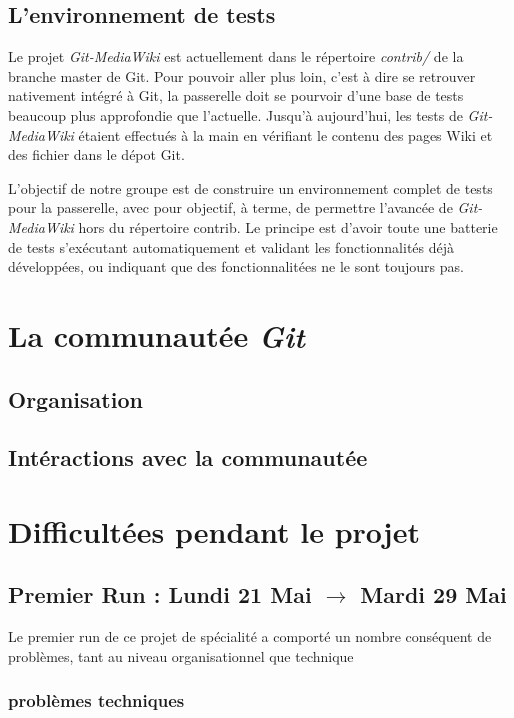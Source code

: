 \documentclass[11pt]{article}
\begin{document}
\subsection{L'environnement de tests}

Le projet \textit{Git-MediaWiki} est actuellement dans le répertoire \textit{contrib/} de la branche master de Git. Pour pouvoir aller plus loin, c'est à dire se retrouver nativement intégré à Git, la passerelle doit se pourvoir d'une base de tests beaucoup plus approfondie que l'actuelle. Jusqu'à aujourd'hui, les tests de \textit{Git-MediaWiki} étaient effectués à la main en vérifiant le contenu des pages Wiki et des fichier dans le dépot Git. 

L'objectif de notre groupe est de construire un environnement complet de tests pour la passerelle, avec pour objectif, à terme, de permettre l'avancée de \textit{Git-MediaWiki} hors du répertoire contrib. Le principe est d'avoir toute une batterie de tests s'exécutant automatiquement et validant les fonctionnalités déjà développées, ou indiquant que des fonctionnalitées ne le sont toujours pas.

\section{La communautée \textit{Git}}

\subsection{Organisation}

\subsection{Intéractions avec la communautée}

\section{Difficultées pendant le projet}

\subsection{Premier Run : Lundi 21 Mai $\rightarrow$ Mardi 29 Mai}

Le premier run de ce projet de spécialité a comporté un nombre conséquent de problèmes, tant au niveau organisationnel que technique

\subsubsection{problèmes techniques}
\end{document}
